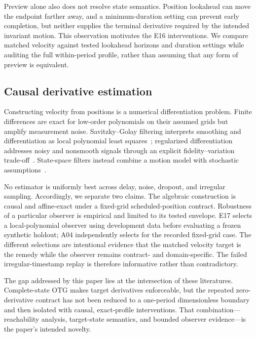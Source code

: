Preview alone also does not resolve state semantics. Position lookahead can move the endpoint farther away, and a minimum-duration setting can prevent early completion, but neither supplies the terminal derivative required by the intended invariant motion. This observation motivates the E16 interventions. We compare matched velocity against tested lookahead horizons and duration settings while auditing the full within-period profile, rather than assuming that any form of preview is equivalent.

\subsection{Causal derivative estimation}

Constructing velocity from positions is a numerical differentiation problem. Finite differences are exact for low-order polynomials on their assumed grids but amplify measurement noise. Savitzky--Golay filtering interprets smoothing and differentiation as local polynomial least squares~\cite{savitzky1964smoothing,gorry1990least}; regularized differentiation addresses noisy and nonsmooth signals through an explicit fidelity--variation trade-off~\cite{chartrand2011differentiation}. State-space filters instead combine a motion model with stochastic assumptions~\cite{kalman1960filter,brown2012filtering}.

No estimator is uniformly best across delay, noise, dropout, and irregular sampling. Accordingly, we separate two claims. The algebraic \FutureOOne{} construction is causal and affine-exact under a fixed-grid scheduled-position contract. Robustness of a particular observer is empirical and limited to its tested envelope. E17 selects a local-polynomial observer using development data before evaluating a frozen synthetic holdout; A04 independently selects \FutureOOne{} for the recorded fixed-grid case. The different selections are intentional evidence that the matched velocity target is the remedy while the observer remains contract- and domain-specific. The failed irregular-timestamp replay is therefore informative rather than contradictory.

The gap addressed by this paper lies at the intersection of these literatures. Complete-state OTG makes target derivatives enforceable, but the repeated zero-derivative contract has not been reduced to a one-period dimensionless boundary and then isolated with causal, exact-profile interventions. That combination---reachability analysis, target-state semantics, and bounded observer evidence---is the paper's intended novelty.


